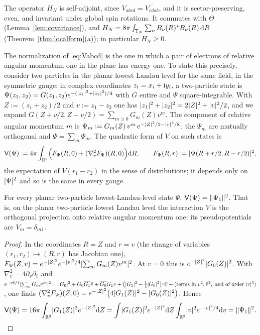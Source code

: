 The operator $H_N$ is self-adjoint, since $V_{abcd}=\overline{V_{cdab}}$, and it is sector-preserving, even,
and invariant under global spin rotations. It commutes with $\Theta$ (Lemma~\ref{lem:covariance}), and
$H_N=8\pi\int_{\mathbb{T}_N}\sum_\nu B_\nu(R)^*B_\nu(R)\,\mathrm{d} R$ (Theorem~\ref{thm:localform}(a)); in particular
$H_N\ge0$.

The normalization of \eqref{eq:Vabcd} is the one in which a pair of electrons of relative angular momentum
one in the plane has energy one. To state this precisely, consider two particles in the planar lowest Landau
level for the same field, in the symmetric gauge: in complex coordinates $z_i=x_i+\mathrm{i} y_i$, a two-particle
state is $\Psi(z_1,z_2)=G(z_1,z_2)e^{-(\lvert z_1\rvert^2+\lvert z_2\rvert^2)/4}$ with $G$ entire and $\Psi$
square-integrable. With $Z:=(z_1+z_2)/2$ and $v:=z_1-z_2$ one has $\lvert z_1\rvert^2+\lvert z_2\rvert^2=2\lvert Z\rvert^2+\lvert v\rvert^2/2$,
and we expand $G(Z+v/2,Z-v/2)=\sum_{m\ge0}G_m(Z)v^m$. The component of relative angular momentum $m$ is
$\Psi_m:=G_m(Z)\,v^m\,e^{-\lvert Z\rvert^2/2-\lvert v\rvert^2/8}$; the $\Psi_m$ are mutually orthogonal and $\Psi=\sum_m\Psi_m$.
The quadratic form of $V$ on such states is
\[
\mathsf V(\Psi):=4\pi\int_{\mathbb{R}^2}\Bigl(F_\Psi(R,0)+(\nabla_r^2F_\Psi)(R,0)\Bigr)\mathrm{d} R,\qquad
F_\Psi(R,r):=\lvert\Psi(R+r/2,R-r/2)\rvert^2,
\]
the expectation of $V(r_1-r_2)$ in the sense of distributions; it depends only on $\lvert\Psi\rvert^2$ and so is the
same in every gauge.

\begin{lemma}[$V_1$ units]\label{lem:units}
For every planar two-particle lowest-Landau-level state $\Psi$, $\mathsf V(\Psi)=\lVert\Psi_1\rVert^2$. That is, on the
planar two-particle lowest Landau level the interaction $V$ is the orthogonal projection onto relative
angular momentum one: its pseudopotentials are $V_m=\delta_{m1}$.
\end{lemma}

\begin{proof}
In the coordinates $R=Z$ and $r=v$ (the change of variables $(r_1,r_2)\mapsto(R,r)$ has Jacobian one),
$F_\Psi(Z,v)=e^{-\lvert Z\rvert^2}e^{-\lvert v\rvert^2/4}\lvert\sum_mG_m(Z)v^m\rvert^2$. At $v=0$ this is $e^{-\lvert Z\rvert^2}\lvert G_0(Z)\rvert^2$.
With $\nabla_v^2=4\partial_v\partial_{\bar v}$ and
$e^{-v\bar v/4}\lvert\sum_mG_mv^m\rvert^2=\lvert G_0\rvert^2+G_0\overline{G_1}\bar v+\overline{G_0}G_1v
+\bigl(\lvert G_1\rvert^2-\tfrac14\lvert G_0\rvert^2\bigr)v\bar v+(\text{terms in }v^2,\bar v^2,\text{ and of order }\lvert v\rvert^3)$,
one finds $(\nabla_v^2F_\Psi)(Z,0)=e^{-\lvert Z\rvert^2}\bigl(4\lvert G_1(Z)\rvert^2-\lvert G_0(Z)\rvert^2\bigr)$. Hence
\[
\mathsf V(\Psi)=16\pi\int_{\mathbb{R}^2}\lvert G_1(Z)\rvert^2e^{-\lvert Z\rvert^2}\mathrm{d} Z
=\int\lvert G_1(Z)\rvert^2e^{-\lvert Z\rvert^2}\mathrm{d} Z\int_{\mathbb{R}^2}\lvert v\rvert^2e^{-\lvert v\rvert^2/4}\mathrm{d} v=\lVert\Psi_1\rVert^2 .\qedhere
\]
\end{proof}

